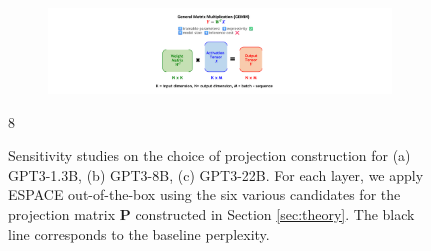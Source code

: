 \documentclass{article}
\theoremstyle{plain}
\begin{document}
\begin{figure}[!t]
\begin{center}
\begin{subfigure}[t]{0.7\textwidth}
    \centering     
    \includegraphics[trim=21.5cm 0.5cm 22cm 0.5cm, clip, width = 0.95\linewidth,page=13]{espace_paper_figures.pdf}
    \caption{}    
    \end{subfigure}8
\end{center}
\caption{\footnotesize Sensitivity studies on the choice of projection construction for (a) GPT3-1.3B, (b) GPT3-8B, (c) GPT3-22B. For each layer, we apply ESPACE out-of-the-box using the six various candidates for the projection matrix $\mathbf{P}$ constructed in Section \ref{sec:theory}. The black line corresponds to the baseline perplexity.}
\label{fig:sensistivities_gpt}
\end{figure}
\end{document}
